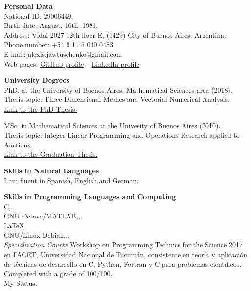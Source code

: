 \textbf{Personal Data}\\[6pt]
National ID: 29006449.\\
Birth date: August, 16th. 1981.\\
Address: Vidal 2027 12th floor E, (1429) City of Buenos Aires. Argentina.\\
Phone number: +54 9 11 5 040 0483.\\
E-mail: alexis.jawtuschenko@gmail.com\\
Web pages: \href{https://github.com/alexisjawtu}{{\color{blue}GitHub profile}}
-- \href{https://www.linkedin.com/in/alexis-jawtuschenko/}{{\color{blue}LinkedIn profile}}

\textbf{University Degrees}\\[6pt]
PhD. at the University of Buenos Aires, Mathematical Sciences area (2018).\\
Thesis topic: Three Dimensional Meshes and Vectorial Numerical Analysis.\\
\href{https://cms.dm.uba.ar/academico/carreras/doctorado/thesisJawtuschenko.pdf}
{{\color{blue}Link to the PhD Thesis.}}

MSc. in Mathematical Sciences at the Univesity of Buenos Aires (2010).\\
Thesis topic: Integer Linear Programming and Operations Research applied to Auctions.\\
\href{https://cms.dm.uba.ar/academico/carreras/licenciatura/tesis/2010/Jawtuschenko_Alexis.pdf}
{{\color{blue}Link to the Graduation Thesis.}}

\textbf{Skills in Natural Languages}\\[6pt]
I am fluent in Spanish, English and German.

\textbf{Skills in Programming Languages and Computing}\\[6pt]
C\masmas,\;.\\[4pt]
{GNU Octave/MATLAB},\;,\;.\\[4pt]
{LaTeX}.\\[4pt] 
{GNU/Linux Debian},\;,\;.\\[4pt]
\emph{Specialization Course}
Workshop on Programming Technics for the Science 2017 en FACET, 
Universidad Nacional de Tucum\'an, consistente en teor\'ia y aplicaci\'on de t\'ecnicas 
de desarrollo en C, Python, Fortran y C\masmas\,\,para problemas cient\'ificos.
Completed with a grade of 100/100.\\[4pt]
My \href{https://projecteuler.net/profile/alexisj.png}
        {\color{blue}{Project Euler}}
Status.
	

